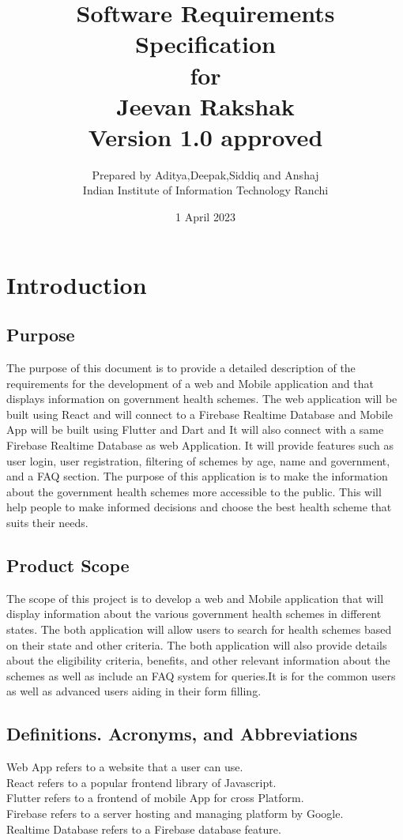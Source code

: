 \documentclass{article}
\title{Software Requirements Specification \\ for \\ Jeevan Rakshak \\ Version 1.0 approved }
\author{Prepared by Aditya,Deepak,Siddiq and Anshaj \\ Indian Institute of Information Technology Ranchi \\ }
\date{1 April 2023}
\begin{document}
\maketitle{}

\tableofcontents

\section{Introduction}
\subsection{Purpose}
The purpose of this document is to provide a detailed description of the
requirements for the development of a web and Mobile application and
that displays information on government health schemes. The web
application will be built using React and will connect to a Firebase
Realtime Database and Mobile App will be built using Flutter and Dart
and It will also connect with a same Firebase Realtime Database as web
Application. It will provide features such as user login, user
registration, filtering of schemes by age, name and government, and a
FAQ section. The purpose of this application is to make the information
about the government health schemes more accessible to the public. This
will help people to make informed decisions and choose the best health
scheme that suits their needs.

\subsection{Product Scope}
The scope of this project is to develop a web and Mobile application
that will display information about the various government health
schemes in different states. The both application will allow users to
search for health schemes based on their state and other criteria. The
both application will also provide details about the eligibility
criteria, benefits, and other relevant information about the schemes as
well as include an FAQ system for queries.It is for the common users as
well as advanced users aiding in their form filling.

\subsection{Definitions. Acronyms, and Abbreviations}
Web App refers to a website that a user can use. 
\\
React refers to a popular frontend library of Javascript.
\\
Flutter refers to a frontend of mobile App for cross Platform.
\\
Firebase refers to a server hosting and managing platform by Google.
\\
Realtime Database refers to a Firebase database feature.
\end{document}
